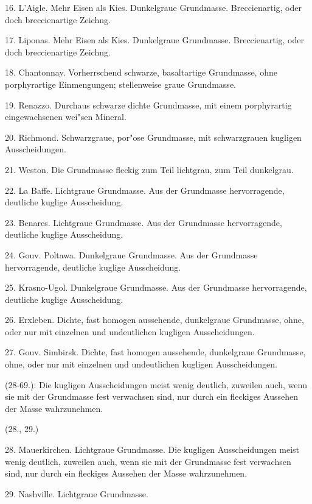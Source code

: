 \documentclass[a4paper, 11pt, oneside, polutonikogreek, german]{article}
\begin{document}
16. L'Aigle. Mehr Eisen als Kies. Dunkelgraue Grundmasse. Breccienartig, oder doch breccienartige Zeichng.

17. Liponas. Mehr Eisen als Kies. Dunkelgraue Grundmasse. Breccienartig, oder doch breccienartige Zeichng.

18. Chantonnay. Vorherrschend schwarze, basaltartige Grundmasse, ohne porphyrartige Einmengungen; stellenweise graue Grundmasse.

19. Renazzo. Durchaus schwarze dichte Grundmasse, mit einem porphyrartig eingewachsenen wei"sen Mineral.

20. Richmond. Schwarzgraue, por"ose Grundmasse, mit schwarzgrauen kugligen Ausscheidungen.

21. Weston. Die Grundmasse fleckig zum Teil lichtgrau, zum Teil dunkelgrau.

22. La Baffe. Lichtgraue Grundmasse. Aus der Grundmasse hervorragende, deutliche kuglige Ausscheidung.

23. Benares. Lichtgraue Grundmasse. Aus der Grundmasse hervorragende, deutliche kuglige Ausscheidung.

24. Gouv. Poltawa. Dunkelgraue Grundmasse. Aus der Grundmasse hervorragende, deutliche kuglige Ausscheidung. 

25. Krasno-Ugol. Dunkelgraue Grundmasse. Aus der Grundmasse hervorragende, deutliche kuglige Ausscheidung.

26. Erxleben. Dichte, fast homogen aussehende, dunkelgraue Grundmasse, ohne, oder nur mit einzelnen und undeutlichen kugligen Ausscheidungen.

27. Gouv. Simbirsk. Dichte, fast homogen aussehende, dunkelgraue Grundmasse, ohne, oder nur mit einzelnen und undeutlichen kugligen Ausscheidungen.

\vspace{2ex}

(28-69.): Die kugligen Ausscheidungen meist wenig deutlich, zuweilen auch, wenn sie mit der Grundmasse fest verwachsen sind, nur durch ein fleckiges Aussehen der Masse wahrzunehmen.
\begin{center}
(28., 29.)
\end{center}
\hspace*{6mm}28. Mauerkirchen. Lichtgraue Grundmasse. Die kugligen Ausscheidungen meist wenig deutlich, zuweilen auch, wenn sie mit der Grundmasse fest verwachsen sind, nur durch ein fleckiges Aussehen der Masse wahrzunehmen.

29. Nashville. Lichtgraue Grundmasse.
\end{document}
